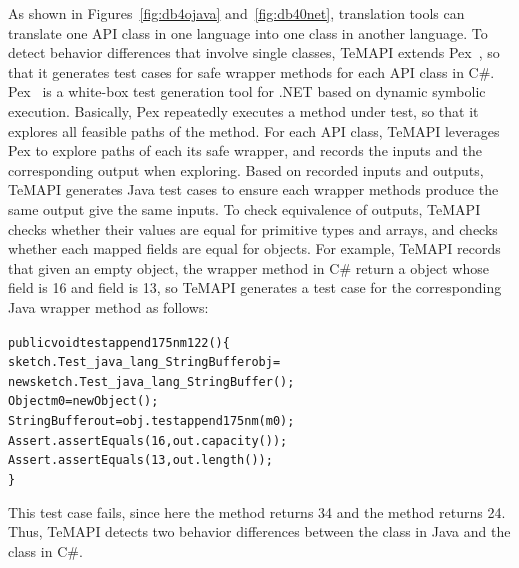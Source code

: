 As shown in Figures~\ref{fig:db4ojava} and~\ref{fig:db40net}, translation tools can translate one API class in one language into one class in another language. To detect behavior differences that involve single classes, TeMAPI extends Pex~\cite{tillmann2008pex}, so that it generates test cases for safe wrapper methods for each API class in C\#. Pex~\cite{tillmann2008pex} is a white-box test generation tool for .NET based on dynamic symbolic execution. Basically, Pex repeatedly executes a method under test, so that it explores all feasible paths of the method.
For each API class, TeMAPI leverages Pex to explore paths of each its safe wrapper, and records the inputs and the corresponding output when exploring. Based on recorded inputs and outputs, TeMAPI generates Java test cases to ensure each wrapper methods produce the same output give the same inputs. To check equivalence of  outputs, TeMAPI checks whether their values are equal for primitive types and arrays, and checks whether each mapped fields are equal for objects. For example, TeMAPI records that given an empty object, the  wrapper method in C\# return a  object whose  field is 16 and  field is 13, so TeMAPI generates a test case for the corresponding Java wrapper method as follows:

\begin{CodeOut}\vspace*{-1ex}
\begin{alltt}
public void testappend175nm122()\{
  sketch.Test_java_lang_StringBuffer obj =
      new sketch.Test_java_lang_StringBuffer();
  Object m0 = new Object();
  StringBuffer out = obj.testappend175nm(m0);
  Assert.assertEquals(16, out.capacity());	
  Assert.assertEquals(13, out.length());
\}
\end{alltt}
\end{CodeOut}\vspace*{-2ex}

This test case fails, since here the  method returns 34 and the  method returns 24. Thus, TeMAPI detects two behavior differences between the  class in Java and the  class in C\#.


